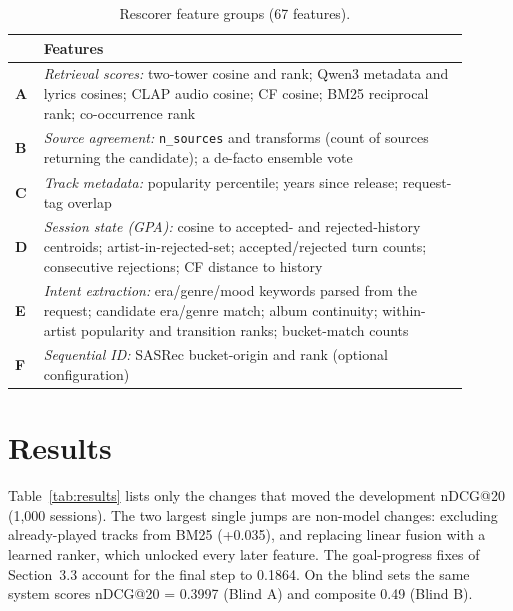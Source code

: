 \documentclass[sigconf]{acmart}
\begin{document}
\begin{table}[t]
  \caption{Rescorer feature groups (67 features).}
  \label{tab:features}
  \centering
  \small
  \renewcommand{\arraystretch}{1.2}
  \setlength{\tabcolsep}{4pt}
  \begin{tabular}{@{}>{\bfseries}p{0.055\linewidth} p{0.85\linewidth}@{}}
    \toprule
    \multicolumn{1}{@{}l}{\bfseries Grp.} & \textbf{Features} \\
    \midrule
    A & \emph{Retrieval scores:} two-tower cosine and rank; Qwen3 metadata and lyrics cosines; CLAP audio cosine; CF cosine; BM25 reciprocal rank; co-occurrence rank \\[2pt]
    B & \emph{Source agreement:} \texttt{n\_sources} and transforms (count of sources returning the candidate); a de-facto ensemble vote \\[2pt]
    C & \emph{Track metadata:} popularity percentile; years since release; request-tag overlap \\[2pt]
    D & \emph{Session state (GPA):} cosine to accepted- and rejected-history centroids; artist-in-rejected-set; accepted/rejected turn counts; consecutive rejections; CF distance to history \\[2pt]
    E & \emph{Intent extraction:} era/genre/mood keywords parsed from the request; candidate era/genre match; album continuity; within-artist popularity and transition ranks; bucket-match counts \\[2pt]
    F & \emph{Sequential ID:} SASRec bucket-origin and rank (optional configuration) \\
    \bottomrule
  \end{tabular}
\end{table}

\section{Results}

Table~\ref{tab:results} lists only the changes that moved the development nDCG@20 (1,000
sessions). The two largest single jumps are non-model changes: excluding
already-played tracks from BM25 (+0.035), and replacing linear fusion with a
learned ranker, which unlocked every later feature. The goal-progress fixes of
Section~3.3 account for the final step to 0.1864. On the blind sets the same
system scores nDCG@20 = 0.3997 (Blind A) and composite 0.49 (Blind B).
\end{document}
